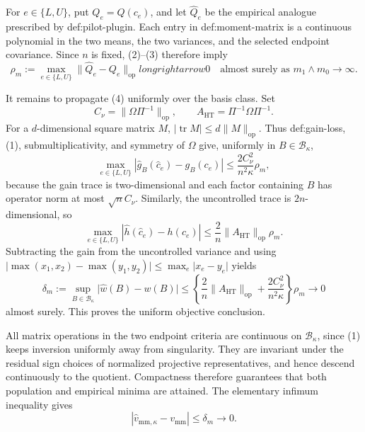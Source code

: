For \(e\in\{L,U\}\), put \(Q_e=Q(c_e)\), and let \(\widehat Q_e\) be the empirical analogue prescribed by def:pilot-plugin.  Each entry in def:moment-matrix is a continuous polynomial in the two means, the two variances, and the selected endpoint covariance.  Since \(n\) is fixed, (2)--(3) therefore imply
\[
 \rho_m:=\max_{e\in\{L,U\}}
 \lVert\widehat Q_e-Q_e\rVert_{\mathrm{op}}longrightarrow0
 \quad\text{almost surely as }m_1\wedge m_0\to\infty.
 \tag{4}
\]

It remains to propagate (4) uniformly over the basis class.  Set
\[
 C_\nu=\lVert\Omega\Pi^{-1}\rVert_{\mathrm{op}},
 \qquad
 A_{\mathrm{HT}}=\Pi^{-1}\Omega\Pi^{-1}.
\]
For a \(d\)-dimensional square matrix \(M\), \(\lvert\operatorname{tr}M\rvert\le d\lVert M\rVert_{\mathrm{op}}\).  Thus def:gain-loss, (1), submultiplicativity, and symmetry of \(\Omega\) give, uniformly in \(B\in\mathcal B_\kappa\),
\[
 \max_{e\in\{L,U\}}
 \left\lvert\widehat g_B(\widehat c_e)-g_B(c_e)\right\rvert
 \le \frac{2C_\nu^2}{n^2\kappa}\rho_m,
 \tag{5}
\]
because the gain trace is two-dimensional and each factor containing \(B\) has operator norm at most \(\sqrt n C_\nu\).  Similarly, the uncontrolled trace is \(2n\)-dimensional, so
\[
 \max_{e\in\{L,U\}}
 \left\lvert\widehat h(\widehat c_e)-h(c_e)\right\rvert
 \le \frac{2}{n}\lVert A_{\mathrm{HT}}\rVert_{\mathrm{op}}\rho_m.
 \tag{6}
\]
Subtracting the gain from the uncontrolled variance and using
\(\lvert\max(x_1,x_2)-\max(y_1,y_2)\rvert\le\max_e\lvert x_e-y_e\rvert\) yields
\[
 \delta_m:=\sup_{B\in\mathcal B_\kappa}
 \lvert\widehat w(B)-w(B)\rvert
 \le
 \left\{
 \frac{2}{n}\lVert A_{\mathrm{HT}}\rVert_{\mathrm{op}}
 +\frac{2C_\nu^2}{n^2\kappa}
 \right\}\rho_m
 \longrightarrow0
 \tag{7}
\]
almost surely.  This proves the uniform objective conclusion.

All matrix operations in the two endpoint criteria are continuous on \(\mathcal B_\kappa\), since (1) keeps inversion uniformly away from singularity.  They are invariant under the residual sign choices of normalized projective representatives, and hence descend continuously to the quotient.  Compactness therefore guarantees that both population and empirical minima are attained.  The elementary infimum inequality gives
\[
 \left\lvert\widehat v_{\mathrm{mm},\kappa}-v_{\mathrm{mm}}\right\rvert
 \le\delta_m\longrightarrow0.
 \tag{8}
\]

